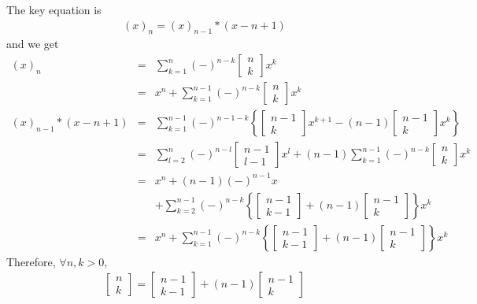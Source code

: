 \documentclass[11pt]{book}
\begin{document}
The key equation is
\begin{eqnarray}
(x)_n = (x)_{n-1}*  (x-n+1)
\end{eqnarray}
and we get
\begin{eqnarray}
(x)_n &=& \sum_{k=1}^n (-)^{n-k} \left[\begin{array}{c}n \\k \end{array}\right] x^k\\
&=& x^n + \sum_{k=1}^{n-1} (-)^{n-k} \left[\begin{array}{c}n \\k \end{array}\right] x^k\\
(x)_{n-1}*  (x-n+1) &=&  \sum_{k=1}^{n-1} (-)^{n-1-k} \left\{ \left[\begin{array}{c}n-1 \\k \end{array}\right] x^{k+1} -(n-1) \left[\begin{array}{c}n-1 \\k \end{array}\right] x^k \right\} \qquad \qquad \\
&=& \sum_{l=2}^n (-)^{n-l} \left[\begin{array}{c}n-1 \\l-1 \end{array}\right] x^l + (n-1)\sum_{k=1}^{n-1} (-)^{n-k} \left[\begin{array}{c}n \\k \end{array}\right] x^k \\
\nonumber &=& x^n + (n-1)(-)^{n-1} x \\
&&+ \sum_{k=2}^{n-1} (-)^{n-k} \left\{ \left[\begin{array}{c}n-1 \\k-1 \end{array}\right]  + (n-1)  \left[\begin{array}{c}n-1 \\k \end{array}\right] \right\} x^k \\
&=& x^n + \sum_{k=1}^{n-1} (-)^{n-k} \left\{ \left[\begin{array}{c}n-1 \\k-1 \end{array}\right]  + (n-1)  \left[\begin{array}{c}n-1 \\k \end{array}\right] \right\} x^k 
\end{eqnarray}
Therefore, $\forall n,k > 0$,
\begin{eqnarray}
\left[\begin{array}{c}n \\k \end{array}\right] = \left[\begin{array}{c}n-1 \\k-1 \end{array}\right]  + (n-1)  \left[\begin{array}{c}n-1 \\k \end{array}\right]
\end{eqnarray}
  
\end{document}
